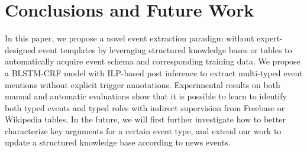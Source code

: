 \section{Conclusions and Future Work}
In this paper, we propose a novel event extraction paradigm without expert-designed event templates by leveraging structured knowledge bases or tables to automatically acquire event schema and corresponding training data. We propose a BLSTM-CRF model with ILP-based post inference to extract multi-typed event mentions without explicit trigger annotations. Experimental results on both manual and automatic evaluations show that it is possible to learn to identify both typed events and typed roles with indirect supervision from Freebase or Wikipedia tables. 
In the future, we will first further investigate how to better characterize key arguments for a certain event type, and extend our work to update a structured knowledge base according to news events.

